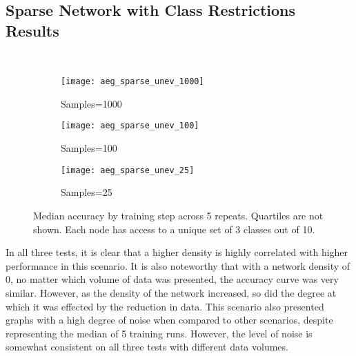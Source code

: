 \subsection{Sparse Network with Class Restrictions Results}
\begin{figure}[H] 
	 \\
	\begin{subfigure}{0.49\textwidth}
		\texttt{[image: aeg\_sparse\_unev\_1000]}
		\caption{Samples=1000}
	\end{subfigure}
	\begin{subfigure}{0.49\textwidth}
		\texttt{[image: aeg\_sparse\_unev\_100]}
		\caption{Samples=100}
	\end{subfigure}
\begin{subfigure}{0.49\textwidth}
	\texttt{[image: aeg\_sparse\_unev\_25]}
	\caption{Samples=25}
\end{subfigure}
	\caption{Median accuracy by training step across 5 repeats. Quartiles are not shown. Each node has access to a unique set of 3 classes out of 10.}
	\label{aeg9}
\end{figure}


In all three tests, it is clear that a higher density is highly correlated with higher performance in this scenario. It is also noteworthy that with a network density of 0, no matter which volume of data was presented, the accuracy curve was very similar. However, as the density of the network increased, so did the degree at which it was effected by the reduction in data. This scenario also presented graphs with a high degree of noise when compared to other scenarios, despite representing the median of 5 training runs. However, the level of noise is somewhat consistent on all three tests with different data volumes.
